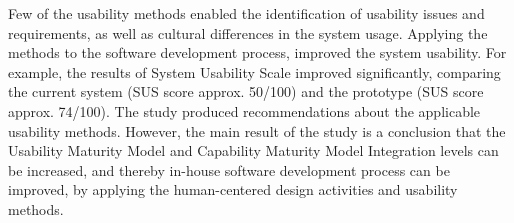 \documentclass[12pt,a4paper,oneside,pdftex]{report}
\begin{document}
{Few of the usability methods enabled the identification of usability issues and requirements, as well as cultural differences in the system usage. Applying the methods to the software development process, improved the system usability. For example, the results of System Usability Scale improved significantly, comparing the current system (SUS score approx. 50/100) and the prototype (SUS score approx. 74/100). The study produced recommendations about the applicable usability methods. However, the main result of the study is a conclusion that the Usability Maturity Model and Capability Maturity Model Integration levels can be increased, and thereby in-house software development process can be improved, by applying the human-centered design activities and usability methods. 
}
\end{document}
